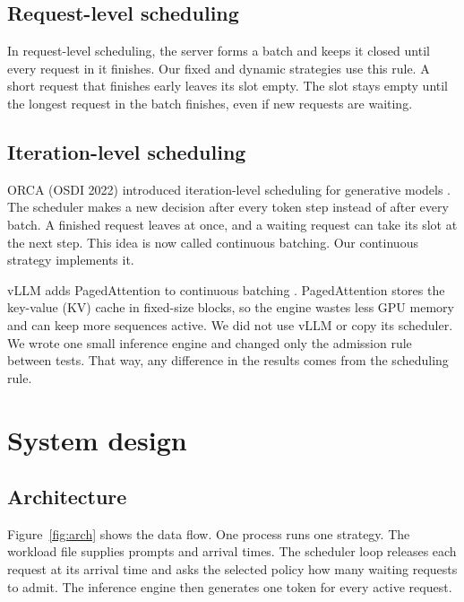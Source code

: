 \documentclass[12pt,a4paper]{article}
\begin{document}
\subsection{Request-level scheduling}
In request-level scheduling, the server forms a batch and keeps it closed until every request in it finishes. Our fixed and dynamic strategies use this rule. A short request that finishes early leaves its slot empty. The slot stays empty until the longest request in the batch finishes, even if new requests are waiting.

\subsection{Iteration-level scheduling}
ORCA (OSDI 2022) introduced iteration-level scheduling for generative models \cite{orca}. The scheduler makes a new decision after every token step instead of after every batch. A finished request leaves at once, and a waiting request can take its slot at the next step. This idea is now called continuous batching. Our continuous strategy implements it.

vLLM adds PagedAttention to continuous batching \cite{vllm}. PagedAttention stores the key-value (KV) cache in fixed-size blocks, so the engine wastes less GPU memory and can keep more sequences active. We did not use vLLM or copy its scheduler. We wrote one small inference engine and changed only the admission rule between tests. That way, any difference in the results comes from the scheduling rule.

\section{System design}

\subsection{Architecture}
Figure~\ref{fig:arch} shows the data flow. One process runs one strategy. The workload file supplies prompts and arrival times. The scheduler loop releases each request at its arrival time and asks the selected policy how many waiting requests to admit. The inference engine then generates one token for every active request.
\end{document}
